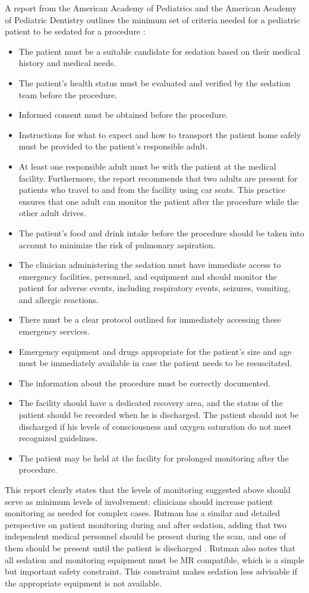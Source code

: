 A report from the American Academy of Pediatrics and the American Academy of Pediatric Dentistry outlines the minimum set of criteria needed for a pediatric patient to be sedated for a procedure \cite{Cote2016}:
\begin{itemize}
\item The patient must be a suitable candidate for sedation based on their medical history and medical needs.
\item The patient's health status must be evaluated and verified by the sedation team before the procedure.
\item Informed consent must be obtained before the procedure.
\item Instructions for what to expect and how to transport the patient home safely must be provided to the patient's responsible adult.
\item At least one responsible adult must be with the patient at the medical facility. Furthermore, the report recommends that two adults are present for patients who travel to and from the facility using car seats. This practice ensures that one adult can monitor the patient after the procedure while the other adult drives.
\item The patient's food and drink intake before the procedure should be taken into account to minimize the risk of pulmonary aspiration.
\item The clinician administering the sedation must have immediate access to emergency facilities, personnel, and equipment and should monitor the patient for adverse events, including respiratory events, seizures, vomiting, and allergic reactions.
\item There must be a clear protocol outlined for immediately accessing these emergency services.
\item Emergency equipment and drugs appropriate for the patient's size and age must be immediately available in case the patient needs to be resuscitated.
\item The information about the procedure must be correctly documented.
\item The facility should have a dedicated recovery area, and the status of the patient should be recorded when he is discharged. The patient should not be discharged if his levels of consciousness and oxygen saturation do not meet recognized guidelines.
\item The patient may be held at the facility for prolonged monitoring after the procedure.
\end{itemize}
\noindent This report clearly states that the levels of monitoring suggested above should serve as minimum levels of involvement: clinicians should increase patient monitoring as needed for complex cases. Rutman has a similar and detailed perspective on patient monitoring during and after sedation, adding that two independent medical personnel should be present during the scan, and one of them should be present until the patient is discharged \cite{Rutman2009}. Rutman also notes that all sedation and monitoring equipment must be MR compatible, which is a simple but important safety constraint. This constraint makes sedation less advisable if the appropriate equipment is not available.

